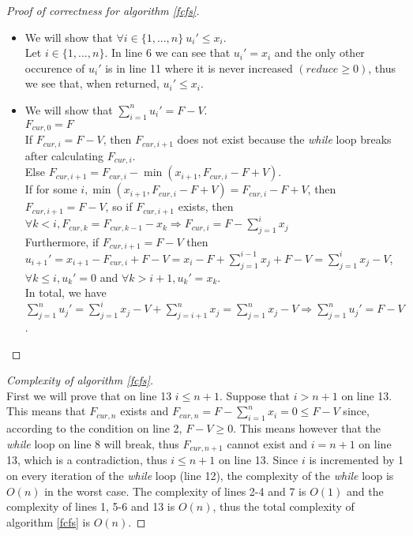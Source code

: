 \documentclass[11pt]{article}
\theoremstyle{definition}
\theoremstyle{corollary}
\begin{document}
    \begin{proof}[Proof of correctness for algorithm \ref{fcfs}] \
       \begin{itemize}
          \item We will show that $\forall i \in \{1,...,n\} \: u_i' \leq x_i$. \\
          Let $i \in \{1,...,n\}$. In line 6 we can see that $u_i' = x_i$ and the only other occurence of $u_i'$
          is in line 11 where it is never increased $(reduce \geq 0)$, thus we see that, when returned, $u_i' \leq x_i$.
          \item We will show that $\sum\limits_{i=1}^{n}u_i' = F - V$. \\
          $F_{cur,0} = F$ \\
          If $F_{cur,i} = F - V$, then $F_{cur,i+1}$ does not exist because the \emph{while} loop breaks after calculating
          $F_{cur,i}$. \\
          Else $F_{cur,i+1} = F_{cur,i} - \min{(x_{i+1}, F_{cur,i} - F + V)}$. \\
          If for some $i, \min{(x_{i+1}, F_{cur,i} - F + V)} = F_{cur,i} - F + V$, then $F_{cur,i+1} = F - V$, so if
          $F_{cur,i+1}$ exists, then $\forall k < i, F_{cur,k} = F_{cur,k-1} - x_k \Rightarrow F_{cur,i} =
          F - \sum\limits_{j=1}^{i}x_j$ \\
          Furthermore, if $F_{cur,i+1} = F - V$ then $u_{i+1}' = x_{i+1} - F_{cur,i} + F - V =
          x_i - F + \sum\limits_{j=1}^{i-1}x_j + F - V = \sum\limits_{j=1}^{i}x_j - V$, $\forall k \leq i, u_k' = 0$
          and $\forall k > i+1, u_k' = x_k$. \\
          In total, we have $\sum\limits_{j=1}^{n}u_j' = \sum\limits_{j=1}^{i}x_j - V + \sum\limits_{j=i+1}^{n}x_j =
          \sum\limits_{j=1}^{n}x_j - V \Rightarrow \sum\limits_{j=1}^{n}u_j' = F - V$.
       \end{itemize}
    \end{proof}
    \begin{proof}[Complexity of algorithm \ref{fcfs}] \ \\
       First we will prove that on line 13 $i \leq n+1$. Suppose that $i > n+1$ on line 13. This means that $F_{cur,n}$
       exists and $F_{cur,n} = F - \sum\limits_{i=1}^{n}x_i = 0 \leq F - V$ since, according to the condition on line 2,
       $F - V \geq 0$. This means however that the \emph{while} loop on line 8 will break, thus $F_{cur,n+1}$ cannot exist
       and $i = n + 1$ on line 13, which is a contradiction, thus $i \leq n+1$ on line 13. Since $i$ is incremented by 1
       on every iteration of the \emph{while} loop (line 12), the complexity of the \emph{while} loop is $O(n)$ in the
       worst case. The complexity of lines 2-4 and 7 is $O(1)$ and the complexity of lines 1, 5-6 and 13 is $O(n)$, thus
       the total complexity of algorithm \ref{fcfs} is $O(n)$.
    \end{proof}
\end{document}
